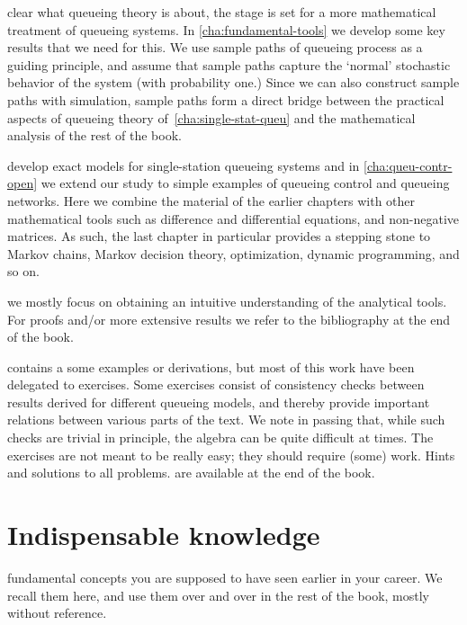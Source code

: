\documentclass[queueing_book]{subfiles}
\begin{document}
 clear what queueing theory is about, the stage is set for a more mathematical treatment of queueing systems.
In \cref{cha:fundamental-tools} we develop some key results that we need for this.
We use sample paths of queueing process as a guiding principle, and assume that sample paths capture the `normal' stochastic behavior of the system (with probability one.)
Since we can also construct sample paths with simulation, sample paths form a direct bridge between the practical aspects of queueing theory of~\cref{cha:single-stat-queu} and the mathematical analysis of the rest of the book.


 develop exact models for single-station queueing systems and in \cref{cha:queu-contr-open} we extend our study to simple examples of queueing control and queueing networks.
Here we combine the material of the earlier chapters with other mathematical tools such as difference and differential equations, and non-negative matrices.
As such, the last chapter in particular provides a stepping stone to Markov chains, Markov decision theory, optimization, dynamic programming, and so on.

 we mostly focus on obtaining an intuitive understanding of the analytical tools.
For proofs and/or more extensive results we refer to the bibliography at the end of the book.


 contains a some examples or derivations, but most of this work have been delegated to exercises.
Some exercises consist of consistency checks between results derived for different queueing models, and thereby provide important relations between various parts of the text.
We note in passing that, while such checks are trivial in principle, the algebra can be quite difficult at times.
The exercises are not meant to be really easy; they should require (some) work.
Hints and solutions to all problems.
are available at the end of the book.


\section{Indispensable knowledge}
\label{sec:indep-knowl}




 fundamental concepts you are supposed to have seen earlier in your career.
We recall them here, and use them over and over in the rest of the book, mostly without reference.
\end{document}
